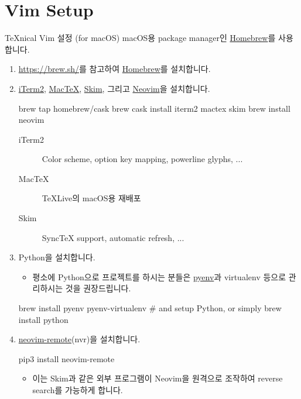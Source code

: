 \documentclass{beamer}
\begin{document}
\section{Vim Setup}

\begin{frame}{\TeX{}nical Vim 설정 (for macOS)}
  macOS용 package manager인 \href{https://brew.sh/}{Homebrew}를 사용합니다.
  \begin{enumerate}
    \item \url{https://brew.sh/}를 참고하여 \href{https://brew.sh/}{Homebrew}를 설치합니다.
    \item \href{https://iterm2.com/}{iTerm2},
      \href{https://www.tug.org/mactex/}{Mac\TeX},
      \href{https://skim-app.sourceforge.io/}{Skim}, 그리고
      \href{https://neovim.io/}{Neovim}을 설치합니다.
      \begin{shellcode}
        brew tap homebrew/cask
        brew cask install iterm2 mactex skim
        brew install neovim
      \end{shellcode}
      \begin{description}
        \item[iTerm2] Color scheme, \alert{option key mapping}, powerline
          glyphs, ...
        \item[Mac\TeX] \TeX{}Live의 macOS용 재배포
        \item[Skim] Sync\TeX{} support, automatic refresh, ...
      \end{description}

    \framebreak
    \item Python을 설치합니다.
      \begin{itemize}
        \item 평소에 Python으로 프로젝트를 하시는 분들은
          \href{https://github.com/pyenv/pyenv#homebrew-on-macos}{pyenv}과
          virtualenv 등으로 관리하시는 것을 권장드립니다.
      \end{itemize}
      \begin{shellcode}
        brew install pyenv pyenv-virtualenv  # and setup Python, or simply
        brew install python
      \end{shellcode}

    \item \href{https://github.com/mhinz/neovim-remote}{neovim-remote}(nvr)을 설치합니다.
      \begin{shellcode}
        pip3 install neovim-remote
      \end{shellcode}
      \begin{itemize}
        \item 이는 Skim과 같은 외부 프로그램이 Neovim을 원격으로 조작하여
          reverse search를 가능하게 합니다.
      \end{itemize}


\end{enumerate}
\end{frame}
\end{document}
